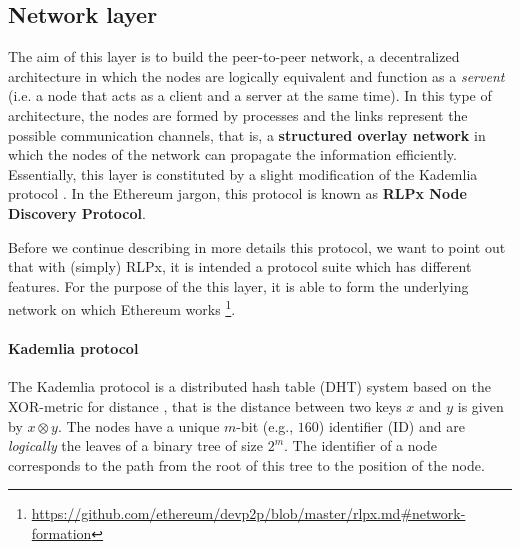 \subsection{Network layer}
\label{sec:network-layer}

The aim of this layer is to build the peer-to-peer network, a decentralized
architecture in which the nodes are logically equivalent and function as a
\emph{servent} (i.e. a node that acts as a client and a server at the same
time). In this type of architecture, the nodes are formed by processes and the
links represent the possible communication channels, that is, a
\textbf{structured overlay network} \cite{van2017distributed} in which the nodes
of the network can propagate the information efficiently. Essentially, this
layer is constituted by a slight modification of the Kademlia protocol
\cite{bib:kademlia}. In the Ethereum jargon, this protocol is known as
\textbf{RLPx Node Discovery Protocol}.

Before we continue describing in more details this protocol, we want to point
out that with (simply) RLPx, it is intended a protocol suite which has different
features. For the purpose of the this layer, it is able to form the underlying
network on which Ethereum works
\footnote{\url{https://github.com/ethereum/devp2p/blob/master/rlpx.md\#network-formation}}.

\paragraph{Kademlia protocol}
The Kademlia protocol is a distributed hash table (DHT) system based on the
XOR-metric for distance \cite{bib:kademlia}, that is the distance between two
keys $x$ and $y$ is given by $x \otimes y$. 
The nodes have a unique $m$-bit (e.g., $160$) identifier (ID) and are 
\emph{logically} the leaves of a binary tree of size $2^m$. 
The identifier of a node corresponds
to the path from the root of this tree to the position of the node.

